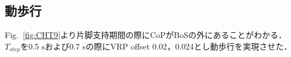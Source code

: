\documentclass[twocolumn]{jsarticle}
\begin{document}
\subsection{動歩行}
Fig.~\ref{fig:CHT9}より片脚支持期間の際にCoPがBoSの外にあることがわかる．$T_{step}$を0.5 sおよび0.7 sの際にVRP offset 0.02，0.024とし動歩行を実現させた． 
\end{document}
